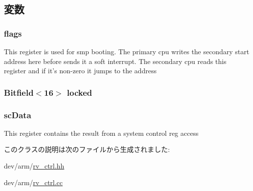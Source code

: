 \subsection{変数}
\hypertarget{classRealViewCtrl_a773b39d480759f67926cb18ae2219281}{
\subsubsection[{flags}]{ {\bf flags}}}
\label{classRealViewCtrl_a773b39d480759f67926cb18ae2219281}
This register is used for smp booting. The primary cpu writes the secondary start address here before sends it a soft interrupt. The secondary cpu reads this register and if it's non-\/zero it jumps to the address \hypertarget{classRealViewCtrl_adab6c58ba2af3a3cc09a54eff7f8375c}{
\subsubsection[{locked}]{\setlength{\rightskip}{0pt plus 5cm}Bitfield$<$16$>$ {\bf locked}}}
\label{classRealViewCtrl_adab6c58ba2af3a3cc09a54eff7f8375c}
\hypertarget{classRealViewCtrl_ae8f7fca2ef5c09642e5b3c139a801fc7}{
\subsubsection[{lockVal}]{}}
\label{classRealViewCtrl_ae8f7fca2ef5c09642e5b3c139a801fc7}
\hypertarget{classRealViewCtrl_af51d9af9e3bf83cfd7a291d1eedd9176}{
\subsubsection[{scData}]{ {\bf scData}}}
\label{classRealViewCtrl_af51d9af9e3bf83cfd7a291d1eedd9176}
This register contains the result from a system control reg access 

このクラスの説明は次のファイルから生成されました:\begin{DoxyCompactItemize}
\item 
dev/arm/\hyperlink{rv__ctrl_8hh}{rv\_\-ctrl.hh}\item 
dev/arm/\hyperlink{rv__ctrl_8cc}{rv\_\-ctrl.cc}\end{DoxyCompactItemize}
